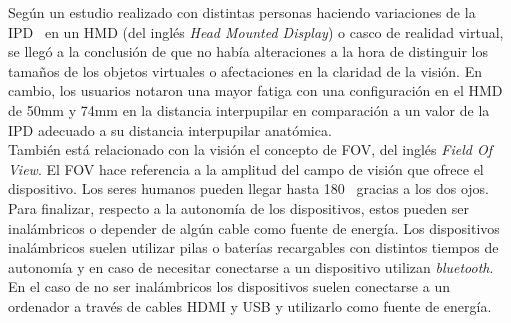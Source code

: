 Según un estudio realizado con distintas personas haciendo variaciones de la IPD~\cite{IPDTest} en un HMD (del inglés \textit{Head Mounted Display}) o casco de realidad virtual, se llegó a la conclusión de que no había alteraciones a la hora de distinguir los tamaños de los objetos virtuales o afectaciones en la claridad de la visión. En cambio, los usuarios notaron una mayor fatiga con una configuración en el HMD de 50mm y 74mm en la distancia interpupilar en comparación a un valor de la IPD adecuado a su distancia interpupilar anatómica.\\

También está relacionado con la visión el concepto de FOV, del inglés \textit{Field Of View}. El FOV hace referencia a la amplitud del campo de visión que ofrece el dispositivo. Los seres humanos pueden llegar hasta 180\degree~ gracias a los dos ojos.\\

Para finalizar, respecto a la autonomía de los dispositivos, estos pueden ser inalámbricos o depender de algún cable como fuente de energía. Los dispositivos inalámbricos suelen utilizar pilas o baterías recargables con distintos tiempos de autonomía y en caso de necesitar conectarse a un dispositivo utilizan \textit{bluetooth}. En el caso de no ser inalámbricos los dispositivos suelen conectarse a un ordenador a través de cables HDMI y USB y utilizarlo como fuente de energía.



